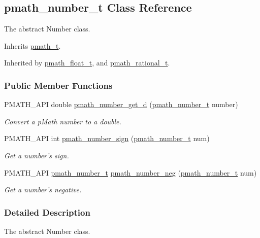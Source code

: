 \hypertarget{classpmath__number__t}{
\subsection{pmath\_\-number\_\-t Class Reference}
\label{classpmath__number__t}
}
The abstract Number class.  


Inherits \hyperlink{classpmath__t}{pmath\_\-t}.

Inherited by \hyperlink{classpmath__float__t}{pmath\_\-float\_\-t}, and \hyperlink{classpmath__rational__t}{pmath\_\-rational\_\-t}.

\subsubsection*{Public Member Functions}
\begin{CompactItemize}
\item 
PMATH\_\-API double \hyperlink{group__numbers_g62617cbeeedaff88caaafec1dc84f329}{pmath\_\-number\_\-get\_\-d} (\hyperlink{classpmath__number__t}{pmath\_\-number\_\-t} number)
\begin{CompactList}\small\item\em Convert a pMath number to a double. \item\end{CompactList}\item 
PMATH\_\-API int \hyperlink{group__numbers_g7a736f04d207d140b3b052438cc371d0}{pmath\_\-number\_\-sign} (\hyperlink{classpmath__number__t}{pmath\_\-number\_\-t} num)
\begin{CompactList}\small\item\em Get a number's sign. \item\end{CompactList}\item 
PMATH\_\-API \hyperlink{classpmath__number__t}{pmath\_\-number\_\-t} \hyperlink{group__numbers_gfbfb5ee7f7cd966432e1cee6fa5b6bf5}{pmath\_\-number\_\-neg} (\hyperlink{classpmath__number__t}{pmath\_\-number\_\-t} num)
\begin{CompactList}\small\item\em Get a number's negative. \item\end{CompactList}\end{CompactItemize}


\subsubsection{Detailed Description}
The abstract Number class. 

